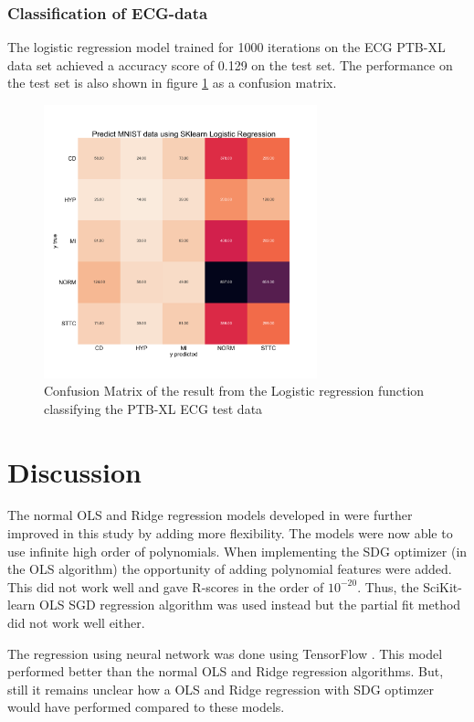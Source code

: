 \documentclass[twocolumn]{cinc}
\begin{document}
\subsubsection{Classification of ECG-data}
The logistic regression model trained for 1000 iterations on the ECG PTB-XL data set achieved a accuracy score of 0.129 on the test set. The performance on the test set is also shown in figure \ref{fig:confmatrixlog_ecg} as a confusion matrix. 
\begin{figure}[htbp!]
\includegraphics[width=7.9cm]{Figures/ECG_confMatrix_sklearn_logreg.png}
\caption{Confusion Matrix of the result from the Logistic regression function classifying the PTB-XL ECG test data}
\label{fig:confmatrixlog_ecg}
\end{figure}


\section{Discussion}
The normal OLS and Ridge regression models developed in \cite{bjorn-jostein_singstad_using_nodate} were further improved in this study by adding more flexibility. The models were now able to use infinite high order of polynomials. When implementing the SDG optimizer (in the OLS algorithm) the opportunity of adding polynomial features were added. This did not work well and gave R-scores in the order of $10^{-20}$. Thus, the SciKit-learn OLS SGD regression algorithm was used instead but the partial fit method did not work well either.

The regression using neural network was done using TensorFlow \cite{martin_abadi_tensorflow_2015}. This model performed better than the normal OLS and Ridge regression algorithms. But, still it remains unclear how a OLS and Ridge regression with SDG optimzer would have performed compared to these models.  
\end{document}
